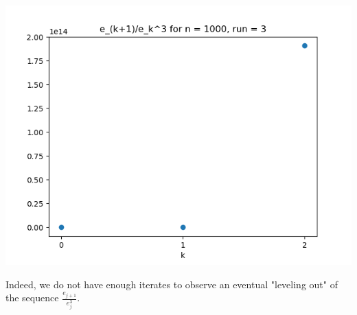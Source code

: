 \documentclass{article}
\begin{document}
\begin{enumerate}
\begin{enumerate}
\begin{center}
			\includegraphics[scale=.4]{hw4 err n = 1000 run = 3}
		\end{center}
		Indeed, we do not have enough iterates to observe an eventual "leveling out" of the sequence $\frac{e_{j+1}}{e_j^3}$.
		
		
		
		
	\end{enumerate}
	
	
	
\end{enumerate}
	
	
\end{document}
